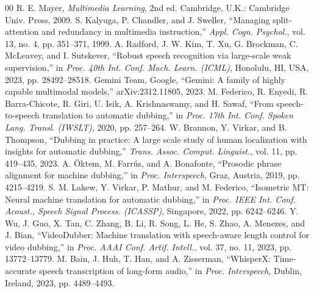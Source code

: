 \documentclass{IEEEtran}
\begin{document}
\begin{thebibliography}{00}
 R. E. Mayer, \textit{Multimedia Learning}, 2nd ed. Cambridge, U.K.: Cambridge Univ. Press, 2009.
 S. Kalyuga, P. Chandler, and J. Sweller, ``Managing split-attention and redundancy in multimedia instruction,'' \textit{Appl. Cogn. Psychol.}, vol. 13, no. 4, pp. 351--371, 1999.
 A. Radford, J. W. Kim, T. Xu, G. Brockman, C. McLeavey, and I. Sutskever, ``Robust speech recognition via large-scale weak supervision,'' in \textit{Proc. 40th Int. Conf. Mach. Learn. (ICML)}, Honolulu, HI, USA, 2023, pp. 28492--28518.
 Gemini Team, Google, ``Gemini: A family of highly capable multimodal models,'' arXiv:2312.11805, 2023.
 M. Federico, R. Enyedi, R. Barra-Chicote, R. Giri, U. Isik, A. Krishnaswamy, and H. Sawaf, ``From speech-to-speech translation to automatic dubbing,'' in \textit{Proc. 17th Int. Conf. Spoken Lang. Transl. (IWSLT)}, 2020, pp. 257--264.
 W. Brannon, Y. Virkar, and B. Thompson, ``Dubbing in practice: A large scale study of human localization with insights for automatic dubbing,'' \textit{Trans. Assoc. Comput. Linguist.}, vol. 11, pp. 419--435, 2023.
 A. \"{O}ktem, M. Farr\'{u}s, and A. Bonafonte, ``Prosodic phrase alignment for machine dubbing,'' in \textit{Proc. Interspeech}, Graz, Austria, 2019, pp. 4215--4219.
 S. M. Lakew, Y. Virkar, P. Mathur, and M. Federico, ``Isometric MT: Neural machine translation for automatic dubbing,'' in \textit{Proc. IEEE Int. Conf. Acoust., Speech Signal Process. (ICASSP)}, Singapore, 2022, pp. 6242--6246.
 Y. Wu, J. Guo, X. Tan, C. Zhang, B. Li, R. Song, L. He, S. Zhao, A. Menezes, and J. Bian, ``VideoDubber: Machine translation with speech-aware length control for video dubbing,'' in \textit{Proc. AAAI Conf. Artif. Intell.}, vol. 37, no. 11, 2023, pp. 13772--13779.
 M. Bain, J. Huh, T. Han, and A. Zisserman, ``WhisperX: Time-accurate speech transcription of long-form audio,'' in \textit{Proc. Interspeech}, Dublin, Ireland, 2023, pp. 4489--4493.
\end{thebibliography}
\end{document}
